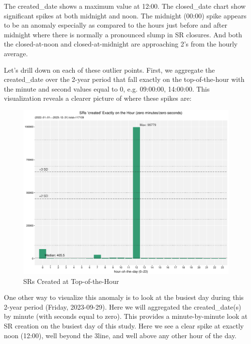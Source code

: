 \documentclass[12pt, titlepage]{article}
\begin{document}
{	The created\_date shows a maximum value at 12:00. The closed\_date chart 
	show significant spikes at both midnight and noon. The midnight (00:00) 
	spike appears to be an anomaly especially as compared to the hours just 
	before and after midnight where there is normally a pronounced slump 
	in SR closures. And both the closed-at-noon and closed-at-midnight are 
	approaching 2\textsigma's from the hourly average. 

	Let's drill down on each of these outlier points. First, we aggregate the 
	created\_date over the 2-year period that fall exactly on the top-of-the-hour 
	with the minute and second values equal to 0, e.g. 09:00:00, 14:00:00. 
	This visualization reveals a clearer picture of where these spikes are:
	
	\begin{figure}[tbp]
		\centering
 		\includegraphics[width = \textwidth]
 		{2-year-trend-SR_created_by_top_of_hour.pdf}
		\caption{SRs Created at Top-of-the-Hour}
		\label{fig:tophourcreated}
	\end{figure}	

	One other way to visualize this anomaly is to look at the busiest day 
	during this 2-year period (Friday, 2023-09-29). Here we will aggregated 
	the created\_date(s) by minute (with seconds equal to zero). This 
	provides a minute-by-minute look at SR creation on the busiest day 
	of this study. Here we see a clear spike at exactly noon (12:00), well 
	beyond the 3\textsigma line, and well above any other hour of the day.
	
}
\end{document}
